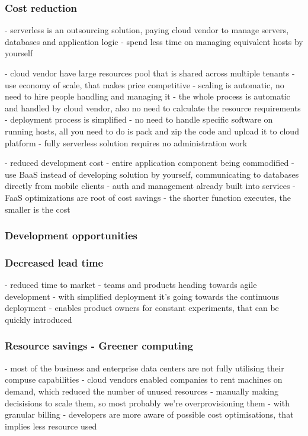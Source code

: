 \subsubsection*{Cost reduction} 


- serverless is an outsourcing solution, paying cloud vendor to manage servers, databases and application logic
- spend less time on managing equivalent hosts by yourself

- cloud vendor have large resources pool that is shared across multiple tenants - use economy of scale, that makes price competitive
- scaling is automatic, no need to hire people handling and managing it - the whole process is automatic and handled by cloud vendor, also no need to calculate the resource requirements
- deployment process is simplified - no need to handle specific software on running hosts, all you need to do is pack and zip the code and upload it to cloud platform
- fully serverless solution requires no administration work

- reduced development cost - entire application component being commodified - use BaaS instead of developing solution by yourself, communicating to databases directly from mobile clients - auth and management already built into services
- FaaS optimizations are root of cost savings - the shorter function executes, the smaller is the cost

\subsubsection*{Development opportunities} 

\subsubsection*{Decreased lead time} 

- reduced time to market - teams and products heading towards agile development - with simplified deployment it's going towards the continuous deployment
- enables product owners for constant experiments, that can be quickly introduced

\subsubsection*{Resource savings - Greener computing} 

- most of the business and enterprise data centers are not fully utilising their compuse capabilities
- cloud vendors enabled companies to rent machines on demand, which reduced the number of unused resources - manually making decisisions to scale them, so most probably we're overprovisioning them
- with granular billing - developers are more aware of possible cost optimisations, that implies less resource used


